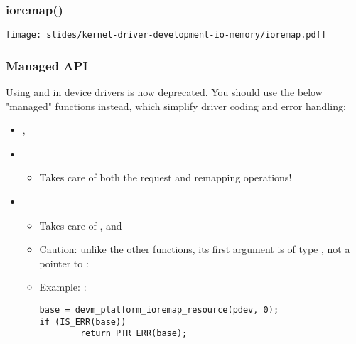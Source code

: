 \begin{frame}[fragile]
  \frametitle{ioremap()}
  \begin{center}
    \texttt{[image: slides/kernel-driver-development-io-memory/ioremap.pdf]}\\
  \end{center}
\end{frame}

\begin{frame}[fragile]
  \frametitle{Managed API}
  Using  and  in device
  drivers is now deprecated. You should use the below "managed"
  functions instead, which simplify driver coding and error handling:
  \begin{itemize}
  \item {}, 
  \item {}
        \begin{itemize}
	\item Takes care of both the request and remapping operations!
	\end{itemize}
  \item {}
        \begin{itemize}
	\item Takes care of ,
	       and 
	\item Caution: unlike the other  functions, its
	      first argument is of type , not a pointer to :
	\item Example: :
	\begin{block}{}
	\begin{verbatim}
base = devm_platform_ioremap_resource(pdev, 0);
if (IS_ERR(base))
        return PTR_ERR(base);
	\end{verbatim}
	\end{block}{}
	\end{itemize}
  \end{itemize}
\end{frame}

